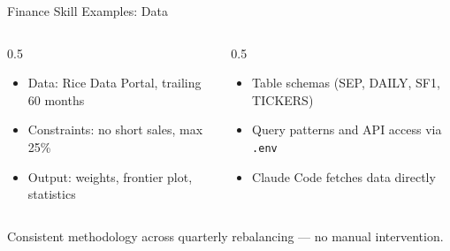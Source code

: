 \documentclass[aspectratio=169]{beamer}
\begin{document}
\begin{frame}{Finance Skill Examples: Data}
\begin{columns}[T]
\begin{column}{0.5\textwidth}
\begin{shadedbox}[title=\textbf{Portfolio Optimization Skill}]
\begin{itemize}\small
  \item Data: Rice Data Portal, trailing 60 months
  \item Constraints: no short sales, max 25\%
  \item Output: weights, frontier plot, statistics
\end{itemize}
\end{shadedbox}
\end{column}
\begin{column}{0.5\textwidth}
\begin{shadedbox}[title=\textbf{Rice Data Portal Skill}]
\begin{itemize}\small
  \item Table schemas (SEP, DAILY, SF1, TICKERS)
  \item Query patterns and API access via \texttt{.env}
  \item Claude Code fetches data directly
\end{itemize}
\end{shadedbox}
\end{column}
\end{columns}
\vspace{0.3cm}
\alert{Consistent methodology across quarterly rebalancing --- no manual intervention.}
\end{frame}
\end{document}
